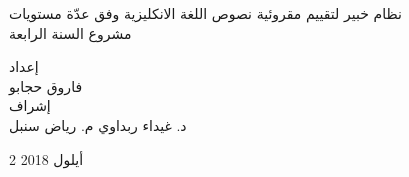 	
	\vspace*{3cm}
	\begin{center}
		{
			\Huge


			نظام خبير لتقييم مقروئية نصوص اللغة الانكليزية وفق عدّة مستويات
			\\[2.5mm]
			\Large
			مشروع السنة الرابعة
		}
	
		\vspace{2cm}
		\begin{doublespace}
			إعداد \\
			{
				\authorsfont
				فاروق حجابو \\[7mm]
			}
			إشراف \\[3mm]
			{
				\authorsfont
				د. غيداء ربداوي
				\hspace{2.5cm}
				م. رياض سنبل
			}
		\end{doublespace}
	\end{center}
		
	\vfill
	\centerline{2 أيلول 2018}
	



